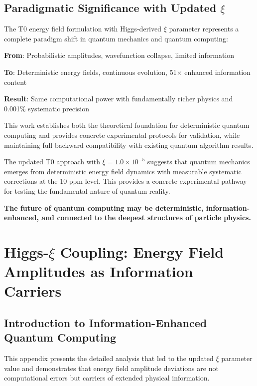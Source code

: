 \documentclass[12pt,a4paper]{article}
\begin{document}
	\subsection{Paradigmatic Significance with Updated $\xi$}
	
	\begin{tcolorbox}[colback=red!5!white,colframe=red!75!black,title=Enhanced Paradigmatic Revolution]
		The T0 energy field formulation with Higgs-derived $\xi$ parameter represents a complete paradigm shift in quantum mechanics and quantum computing:
		
		\textbf{From}: Probabilistic amplitudes, wavefunction collapse, limited information
		
		\textbf{To}: Deterministic energy fields, continuous evolution, 51× enhanced information content
		
		\textbf{Result}: Same computational power with fundamentally richer physics and 0.001\% systematic precision
		
		This work establishes both the theoretical foundation for deterministic quantum computing and provides concrete experimental protocols for validation, while maintaining full backward compatibility with existing quantum algorithm results.
	\end{tcolorbox}
	
	The updated T0 approach with $\xi = 1.0 \times 10^{-5}$ suggests that quantum mechanics emerges from deterministic energy field dynamics with measurable systematic corrections at the 10 ppm level. This provides a concrete experimental pathway for testing the fundamental nature of quantum reality.
	
	\textbf{The future of quantum computing may be deterministic, information-enhanced, and connected to the deepest structures of particle physics.}
	
	\newpage
	\appendix
	
	\section{Higgs-$\xi$ Coupling: Energy Field Amplitudes as Information Carriers}
	
	\subsection{Introduction to Information-Enhanced Quantum Computing}
	
	This appendix presents the detailed analysis that led to the updated $\xi$ parameter value and demonstrates that energy field amplitude deviations are not computational errors but carriers of extended physical information.
	
\end{document}
